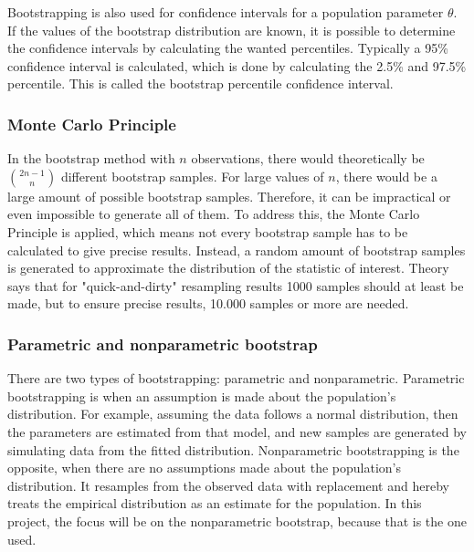 \noindent Bootstrapping is also used for confidence intervals for a population parameter $\theta$. If the values of the bootstrap distribution are known, it is possible to determine the confidence intervals by calculating the wanted percentiles. Typically a 95\% confidence interval is calculated, which is done by calculating the 2.5\% and 97.5\% percentile. This is called the bootstrap percentile confidence interval.

\subsubsection{Monte Carlo Principle}
In the bootstrap method with $n$ observations, there would theoretically be $\binom{2n-1}{n}$ different bootstrap samples. For large values of $n$, there would be a large amount of possible bootstrap samples. Therefore, it can be impractical or even impossible to generate all of them. To address this, the Monte Carlo Principle is applied, which means not every bootstrap sample has to be calculated to give precise results. Instead, a random amount of bootstrap samples is generated to approximate the distribution of the statistic of interest. Theory says that for "quick-and-dirty" resampling results 1000 samples should at least be made, but to ensure precise results, 10.000 samples or more are needed.

\subsubsection{Parametric and nonparametric bootstrap}
There are two types of bootstrapping: parametric and nonparametric. Parametric bootstrapping is when an assumption is made about the population's distribution. For example, assuming the data follows a normal distribution, then the parameters are estimated from that model, and new samples are generated by simulating data from the fitted distribution. Nonparametric bootstrapping is the opposite, when there are no assumptions made about the population's distribution. It resamples from the observed data with replacement and hereby treats the empirical distribution as an estimate for the population. In this project, the focus will be on the nonparametric bootstrap, because that is the one used. \newline


